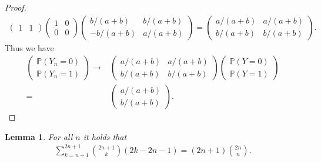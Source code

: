 \documentclass[12pt,reqno]{amsart}
\theoremstyle{plain} %
\newtheorem{lemma}[theorem]{Lemma}
\theoremstyle{remark}
\theoremstyle{definition}
\renewcommand{\P}{\mathbb P}
\begin{document}
\begin{proof}
\begin{align}
\begin{pmatrix}
            1 & 1
        \end{pmatrix}
        \begin{pmatrix}
            1 & 0\\
            0 & 0
        \end{pmatrix}
        \begin{pmatrix}
            b/(a+b) & b/(a+b)\\
            -b/(a+b) & a/(a+b)
        \end{pmatrix}
        =\begin{pmatrix}
            a/(a+b) & a/(a+b)\\
            b/(a+b) & b/(a+b)
        \end{pmatrix}.
\end{align}
Thus we have
\begin{align}
     \begin{pmatrix}
            \P(Y_{n}=0)\\
            \P(Y_{n}=1)
        \end{pmatrix}\to&
        \begin{pmatrix}
            a/(a+b) & a/(a+b)\\
            b/(a+b) & b/(a+b)
        \end{pmatrix}
        \begin{pmatrix}
            \P(Y=0)\\
            \P(Y=1)
        \end{pmatrix}\\
        =&\begin{pmatrix}
            a/(a+b)\\
            b/(a+b)
        \end{pmatrix}.
\end{align}
\end{proof}
\begin{lemma}\label{lem: combosum}
    For all $n$ it holds that
    \begin{align}
        \sum_{k=n+1}^{2n+1}\binom{2n+1}{k}(2k-2n-1)=(2n+1)\binom{2n}{n}.
    \end{align}
\end{lemma}
\end{document}
